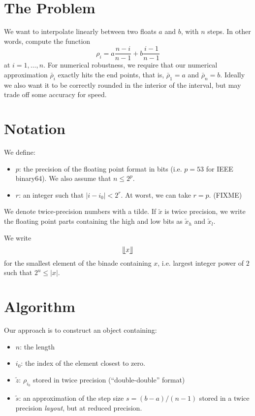 \documentclass{article}
\newcommand{\binadefloor}[1]{\llfloor #1 \rrfloor}
\begin{document}
\section{The Problem}

We want to interpolate linearly between two floats $a$ and $b$, with $n$
steps. In other words, compute the function
\begin{equation*}
  \rho_i = a \frac{n-i}{n-1} + b \frac{i-1}{n-1}
\end{equation*}
at $i = 1,\ldots, n$.  For numerical robustness, we require that our
numerical approximation $\bar\rho_i$ exactly hits the end points, that is,
$\bar\rho_1 = a$ and $\bar\rho_n = b$.  Ideally we also want it to be
correctly rounded in the interior of the interval, but may trade off some
accuracy for speed.


\section{Notation}

We define:
\begin{itemize}
\item $p$: the precision of the floating point format in bits (i.e. $p=53$ for IEEE binary64).  We also assume that $n \leq 2^p$.
\item $r$: an integer such that $|i - i_0| < 2^r$. At worst, we can take $r = p$. 
  (FIXME)
\end{itemize}

We denote twice-precision numbers with a tilde. If $\tilde x$ is twice
precision, we write the floating point parts containing the high and low bits
as $\tilde x_h$ and $\tilde x_l$.

We write
\begin{equation*}
  \binadefloor{x}
\end{equation*}
for the smallest element of the binade containing $x$, i.e. largest integer
power of $2$ such that $2^u \leq |x|$.


\section{Algorithm}

Our approach is to construct an object containing:
\begin{itemize}
\item $n$: the length
\item $i_0$: the index of the element closest to zero.
\item $\tilde z$: $\rho_{i_0}$ stored in twice precision (``double-double'' format)
\item $\tilde s$: an approximation of the step size $s = (b-a)/(n-1)$
  stored in a twice precision \emph{layout}, but at reduced precision.
\end{itemize}
\end{document}
